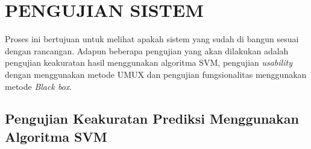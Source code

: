 \section{PENGUJIAN SISTEM}

\par Proses ini bertujuan untuk melihat apakah sistem yang sudah di bangun sesuai dengan rancangan. Adapun beberapa pengujian yang akan dilakukan adalah pengujian keakuratan hasil menggunakan algoritma SVM, pengujian \textit{usability} dengan menggunakan metode UMUX dan pengujian fungsionalitas menggunakan metode \textit{Black box}.

\subsection{Pengujian Keakuratan Prediksi Menggunakan Algoritma SVM}
